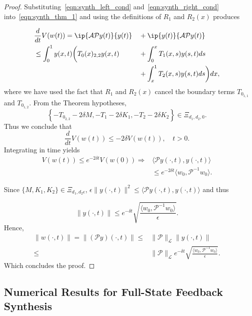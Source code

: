 \documentclass[9pt,journal,twocolumn]{IEEEtran}
\newcommand{\igzo}{\int_0^1}
\newcommand{\igzx}{\int_0^x}
\newcommand{\igxo}{\int_x^1}
\begin{document}
\begin{proof}
Substituting~\eqref{eqn:synth_left_cond} and~\eqref{eqn:synth_right_cond} into~\eqref{eqn:synth_thm_1} and using the definitions of $R_1$ and $R_2(x)$ produces

\begin{alignat*}{2}
&\frac{d}{dt}V(w(t))=\ip{\mathcal{A}\mathcal{P}y(t)}{y(t)}&&+\ip{y(t)}{\mathcal{A}\mathcal{P}y(t)}  \\
&\leq  \igzo y(x,t) \bigg(T_0(x)_{2,2}y(x,t)&&+\igzx T_1(x,s)y(s,t)ds  \\
&  &&+\igxo T_2(x,s)y(s,t)ds   \bigg) dx,
\end{alignat*} where we have used the fact that $R_1$ and $R_2(x)$ cancel the boundary terms $T_{0_{1,1}}$ and $T_{0_{1,2}}$.
From the Theorem hypotheses,
\[
\left\{-T_{0_{2,2}}- 2 \delta M,-T_1-2 \delta K_1, -T_2-2 \delta K_2\right\} \in \Xi_{d_1,d_2,0}.
\]
Thus we conclude that
\[\frac{d}{dt}V(w(t)) \leq -2 \delta V(w(t)) , \quad t >0.\]
Integrating in time yields
\begin{align*}
 V(w(t)) \leq e^{-2 \delta t} V(w(0)) \Rightarrow & \langle \mathcal{P}y(\cdot,t), y(\cdot,t) \rangle \\
  & \leq  e^{-2 \delta t} \langle w_0, \mathcal{P}^{-1}w_0 \rangle.
\end{align*}

Since $\{M,K_1,K_2\} \in \Xi_{d_1,d_2 \epsilon}$, $\epsilon \|y(\cdot,t)\|^2 \leq \langle \mathcal{P}y(\cdot,t), y(\cdot,t) \rangle$ and thus

\[
\|y(\cdot,t)\|   \leq e^{- \delta t} \sqrt{\frac{\langle w_0, \mathcal{P}^{-1}w_0 \rangle}{\epsilon}}.
\]
Hence,
\begin{align*}
\|w(\cdot,t)\|=\|(\mathcal{P}y)(\cdot,t)\| \leq &  \|\mathcal{P}\|_\mathcal{L} \|y(\cdot,t)\| \\
\le &  \|\mathcal{P}\|_\mathcal{L} e^{- \delta t} \sqrt{\frac{\langle w_0, \mathcal{P}^{-1}w_0 \rangle}{\epsilon}}.
\end{align*}
Which concludes the proof.
 \end{proof}


\subsection{Numerical Results for Full-State Feedback Synthesis}\label{contsynthnum}
\end{document}
